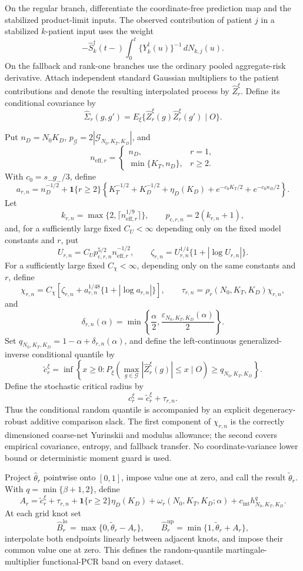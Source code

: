 On the regular branch, differentiate the coordinate-free prediction map and the stabilized product-limit inputs. The observed contribution of patient \(j\) in a stabilized \(k\)-patient input uses the weight
\[
 -\widehat S_k^\dagger(t-)
 \int_0^t\{Y_k^\dagger(u)\}^{-1}\,dN_{k,j}(u).
\]
On the fallback and rank-one branches use the ordinary pooled aggregate-risk derivative. Attach independent standard Gaussian multipliers to the patient contributions and denote the resulting interpolated process by \(\widehat Z_r^\xi\). Define its conditional covariance by
\[
 \widehat\Sigma_r(g,g')
 =E_\xi\{\widehat Z_r^\xi(g)\widehat Z_r^\xi(g')\mid O\}.
\]

Put \(n_D=N_0K_D\), \(p_{\mathcal G}=2|\mathcal G_{N_0,K_T,K_D}|\), and
\[
 n_{\mathrm{eff},r}=
 \begin{cases}
 n_D,&r=1,\\
 \min\{K_T,n_D\},&r\ge2.
 \end{cases}
\]
With \(c_0=s_-g_-/3\), define
\[
 a_{r,n}=n_D^{-1/2}+\mathbf1\{r\ge2\}
 \left\{K_T^{-1/2}+K_D^{-1/2}+\eta_D(K_D)
 +e^{-c_0K_T/2}+e^{-c_0n_D/2}\right\}.
\]
Let
\[
 k_{r,n}=\max\{2,\lceil n_{\mathrm{eff},r}^{1/9}\rceil\},
 \qquad p_{\mathrm c,r,n}=2(k_{r,n}+1),
\]
and, for a sufficiently large fixed \(C_U<\infty\) depending only on the fixed model constants and \(r\), put
\[
 U_{r,n}=C_U p_{\mathrm c,r,n}^{5/2}n_{\mathrm{eff},r}^{-1/2},
 \qquad
 \zeta_{r,n}=U_{r,n}^{1/4}\{1+|\log U_{r,n}|\}.
\]
For a sufficiently large fixed \(C_\chi<\infty\), depending only on the same constants and \(r\), define
\[
 \chi_{r,n}=C_\chi\left[
 \zeta_{r,n}+a_{r,n}^{1/48}\{1+|\log a_{r,n}|\}\right],
 \qquad
 \tau_{r,n}=\rho_r(N_0,K_T,K_D)\chi_{r,n},
\]
and
\[
 \delta_{r,n}(\alpha)=
 \min\left\{\frac\alpha2,
 \frac{\varepsilon_{N_0,K_T,K_D}(\alpha)}2\right\}.
\]
Set \(q_{N_0,K_T,K_D}=1-\alpha+\delta_{r,n}(\alpha)\), and define the left-continuous generalized-inverse conditional quantile by
\[
 \widetilde c_r^\xi=
 \inf\left\{x\ge0:
 P_\xi\left(\max_{g\in\mathcal G}|\widehat Z_r^\xi(g)|\le x
 \mid O\right)\ge q_{N_0,K_T,K_D}\right\}.
\]
Define the stochastic critical radius by
\[
 c_r^\xi=\widetilde c_r^\xi+\tau_{r,n}.
\]
Thus the conditional random quantile is accompanied by an explicit degeneracy-robust additive comparison slack. The first component of \(\chi_{r,n}\) is the correctly dimensioned coarse-net Yurinskii and modulus allowance; the second covers empirical covariance, entropy, and fallback transfer. No coordinate-variance lower bound or deterministic moment guard is used.

Project \(\widehat\theta_r\) pointwise onto \([0,1]\), impose value one at zero, and call the result \(\widetilde\theta_r\). With \(q=\min\{\beta+1,2\}\), define
\[
 A_r=\widetilde c_r^\xi+\tau_{r,n}
 +\mathbf1\{r\ge2\}\eta_D(K_D)
 +\omega_r(N_0,K_T,K_D;\alpha)
 +c_{\mathrm{int}}h_{N_0,K_T,K_D}^{q}.
\]
At each grid knot set
\[
 \widehat B_r^{\mathrm{lo}}=
 \max\{0,\widetilde\theta_r-A_r\},\qquad
 \widehat B_r^{\mathrm{up}}=
 \min\{1,\widetilde\theta_r+A_r\},
\]
interpolate both endpoints linearly between adjacent knots, and impose their common value one at zero. This defines the random-quantile martingale-multiplier functional-PCR band on every dataset.